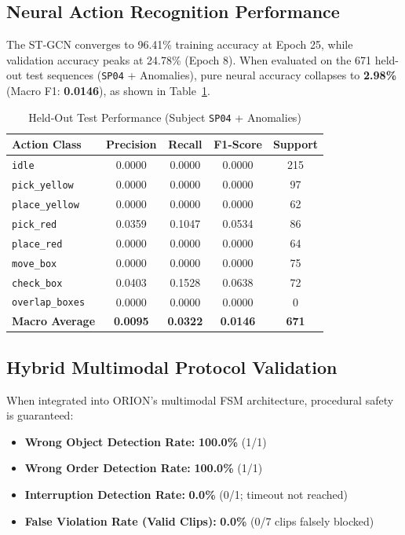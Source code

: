 \documentclass[journal,twocolumn]{IEEEtran}
\begin{document}
\subsection{Neural Action Recognition Performance}
The ST-GCN converges to 96.41\% training accuracy at Epoch 25, while validation accuracy peaks at 24.78\% (Epoch 8). When evaluated on the 671 held-out test sequences (\texttt{SP04} + Anomalies), pure neural accuracy collapses to \textbf{2.98\%} (Macro F1: \textbf{0.0146}), as shown in Table~\ref{tab:har_results}.

\begin{table}[htbp]
\caption{Held-Out Test Performance (Subject \texttt{SP04} + Anomalies)}
\label{tab:har_results}
\centering
\begin{tabular}{lcccc}
\toprule
\textbf{Action Class} & \textbf{Precision} & \textbf{Recall} & \textbf{F1-Score} & \textbf{Support} \\
\midrule
\texttt{idle} & 0.0000 & 0.0000 & 0.0000 & 215 \\
\texttt{pick\_yellow} & 0.0000 & 0.0000 & 0.0000 & 97 \\
\texttt{place\_yellow} & 0.0000 & 0.0000 & 0.0000 & 62 \\
\texttt{pick\_red} & 0.0359 & 0.1047 & 0.0534 & 86 \\
\texttt{place\_red} & 0.0000 & 0.0000 & 0.0000 & 64 \\
\texttt{move\_box} & 0.0000 & 0.0000 & 0.0000 & 75 \\
\texttt{check\_box} & 0.0403 & 0.1528 & 0.0638 & 72 \\
\texttt{overlap\_boxes} & 0.0000 & 0.0000 & 0.0000 & 0 \\
\midrule
\textbf{Macro Average} & \textbf{0.0095} & \textbf{0.0322} & \textbf{0.0146} & \textbf{671} \\
\bottomrule
\end{tabular}
\end{table}

\subsection{Hybrid Multimodal Protocol Validation}
When integrated into ORION's multimodal FSM architecture, procedural safety is guaranteed:
\begin{itemize}
    \item \textbf{Wrong Object Detection Rate:} \textbf{100.0\%} (1/1)
    \item \textbf{Wrong Order Detection Rate:} \textbf{100.0\%} (1/1)
    \item \textbf{Interruption Detection Rate:} \textbf{0.0\%} (0/1; timeout not reached)
    \item \textbf{False Violation Rate (Valid Clips):} \textbf{0.0\%} (0/7 clips falsely blocked)
\end{itemize}
\end{document}
